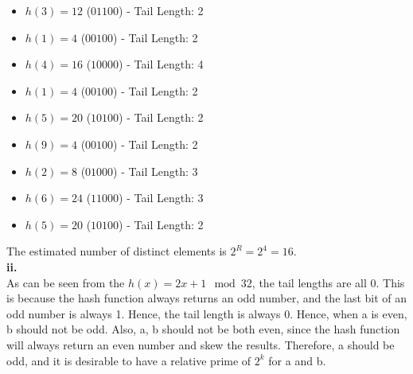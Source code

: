 \documentclass{article}
\begin{document}
\begin{itemize}
    \item \( h(3) = 12 \) (\(01100\)) - Tail Length: 2
    \item \( h(1) = 4 \) (\(00100\)) - Tail Length: 2
    \item \( h(4) = 16 \) (\(10000\)) - Tail Length: 4
    \item \( h(1) = 4 \) (\(00100\)) - Tail Length: 2
    \item \( h(5) = 20 \) (\(10100\)) - Tail Length: 2
    \item \( h(9) = 4 \) (\(00100\)) - Tail Length: 2
    \item \( h(2) = 8 \) (\(01000\)) - Tail Length: 3
    \item \( h(6) = 24 \) (\(11000\)) - Tail Length: 3
    \item \( h(5) = 20 \) (\(10100\)) - Tail Length: 2
\end{itemize}


The estimated number of distinct elements is \( 2^R = 2^4 = 16 \). \\


\textbf{ii.} \\

As can be seen from the \( h(x) = 2x + 1 \mod 32 \), the tail lengths are all 0.
This is because the hash function always returns an odd number, and the last bit of an odd number is always 1. Hence, the tail length is always 0.
Hence, when a is even, b should not be odd. Also, a, b should not be both even, since the hash function will always return an even number and skew the results.
Therefore, a should be odd, and it is desirable to have a relative prime of \(2^k\) for a and b.\\
\end{document}
